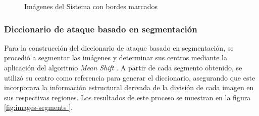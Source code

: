 \begin{figure}[ht]
\begin{minipage}[hb]{0.3\textwidth}
	\end{minipage}
	\caption{Imágenes del Sistema con bordes marcados}
	\label{fig:images-borders}
\end{figure}


\subsubsection{Diccionario de ataque basado en segmentaci\'on}
Para la construcción del diccionario de ataque basado en segmentación, se procedió a segmentar las imágenes y determinar sus centros mediante la aplicación del algoritmo \textit{Mean Shift} \cite{Comaniciu2002MeanSA}. A partir de cada segmento obtenido, se utilizó su centro como referencia para generar el diccionario, asegurando que este incorporara la información estructural derivada de la división de cada imagen en sus respectivas regiones. Los resultados de este proceso se muestran en la figura \ref{fig:images-segments }.

